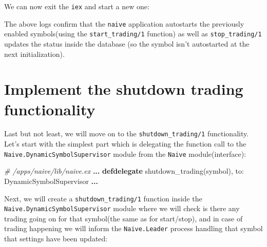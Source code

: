 \documentclass[
  oneside]{book}
\newenvironment{Shaded}{\begin{snugshade}}{\end{snugshade}}
\newcommand{\AttributeTok}[1]{\textcolor[rgb]{0.77,0.63,0.00}{#1}}
\newcommand{\CommentTok}[1]{\textcolor[rgb]{0.56,0.35,0.01}{\textit{#1}}}
\newcommand{\ConstantTok}[1]{\textcolor[rgb]{0.00,0.00,0.00}{#1}}
\newcommand{\ControlFlowTok}[1]{\textcolor[rgb]{0.13,0.29,0.53}{\textbf{#1}}}
\newcommand{\ErrorTok}[1]{\textcolor[rgb]{0.64,0.00,0.00}{\textbf{#1}}}
\newcommand{\ExtensionTok}[1]{#1}
\newcommand{\KeywordTok}[1]{\textcolor[rgb]{0.13,0.29,0.53}{\textbf{#1}}}
\newcommand{\NormalTok}[1]{#1}
\newcommand{\OperatorTok}[1]{\textcolor[rgb]{0.81,0.36,0.00}{\textbf{#1}}}
\newcommand{\VariableTok}[1]{\textcolor[rgb]{0.00,0.00,0.00}{#1}}
\begin{document}
We can now exit the \texttt{iex} and start a new one:

\begin{Shaded}
\end{Shaded}

The above logs confirm that the \texttt{naive} application autostarts the previously enabled symbols(using the \texttt{start\_trading/1} function) as well as \texttt{stop\_trading/1} updates the status inside the database (so the symbol isn't autostarted at the next initialization).

\hypertarget{implement-the-shutdown-trading-functionality}{%
\section{Implement the shutdown trading functionality}\label{implement-the-shutdown-trading-functionality}}

Last but not least, we will move on to the \texttt{shutdown\_trading/1} functionality. Let's start with the simplest part which is delegating the function call to the \texttt{Naive.DynamicSymbolSupervisor} module from the \texttt{Naive} module(interface):

\begin{Shaded}
\begin{Highlighting}[]
  \CommentTok{\# /apps/naive/lib/naive.ex}
  \OperatorTok{...}
  \KeywordTok{defdelegate}\NormalTok{ shutdown\_trading(symbol), }\VariableTok{to:} \ConstantTok{DynamicSymbolSupervisor}
  \OperatorTok{...}
\end{Highlighting}
\end{Shaded}

Next, we will create a \texttt{shutdown\_trading/1} function inside the \texttt{Naive.DynamicSymbolSupervisor} module where we will check is there any trading going on for that symbol(the same as for start/stop), and in case of trading happening we will inform the \texttt{Naive.Leader} process handling that symbol that settings have been updated:
\end{document}
